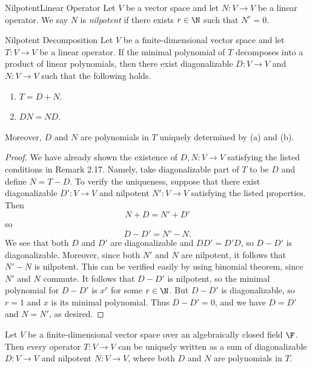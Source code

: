 \documentclass[math_245.tex]{subfiles}
\begin{document}
    \begin{definition}{Nilpotent}{Linear Operator}
        Let $V$ be a vector space and let $N:V\to V$ be a linear operator. We say $N$ is \emph{nilpotent} if there exists $r\in \N$ such that $N^r = 0$. 
    \end{definition}

    \begin{theorem}{Nilpotent Decomposition}
        Let $V$ be a finite-dimensional vector space and let $T:V\to V$ be a linear operator. If the minimal polynomial of $T$ decomposes into a product of linear polynomials, then there exist diagonalizable $D:V\to V$ and $N:V\to V$ such that the following holds.
        \begin{enumerate}
            \item $T = D+N$.
            \item $DN = ND$.
        \end{enumerate}
        Moreover, $D$ and $N$ are polynomials in $T$ uniquely determined by (a) and (b).
    \end{theorem}

    \begin{proof}
        We have already shown the existence of $D, N:V\to V$ satisfying the listed conditions in Remark 2.17. Namely, take diagonalizable part of $T$ to be $D$ and define $N = T-D$. To verify the uniqueness, suppose that there exist diagonalizable $D':V\to V$ and nilpotent $N':V\to V$ satisfying the listed properties. Then
        \begin{equation*}
            N + D = N' + D'
        \end{equation*}
        so
        \begin{equation*}
            D - D' = N' - N.
        \end{equation*}
        We see that both $D$ and $D'$ are diagonalizable and $DD' = D'D$, so $D-D'$ is diagonalizable. Moreover, since both $N'$ and $N$ are nilpotent, it follows that $N'-N$ is nilpotent. This can be verified easily by using binomial theorem, since $N'$ and $N$ commute. It follows that $D-D'$ is nilpotent, so the minimal polynomial for $D-D'$ is $x^r$ for some $r\in \N$. But $D-D'$ is diagonalizable, so $r=1$ and $x$ is its minimal polynomial. Thus $D-D'=0$, and we have $D=D'$ and
        $N=N'$, as desired. 
    \end{proof}

    \begin{cor}{}
        Let $V$ be a finite-dimensional vector space over an algebraically closed field $\F$. Then every operator $T:V\to V$ can be uniquely written as a sum of diagonalizable $D:V\to V$ and nilpotent $N:V\to V$, where both $D$ and $N$ are polynomials in $T$.
    \end{cor}	
\end{document}
